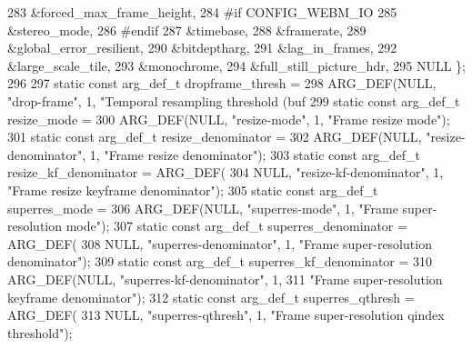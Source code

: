 \begin{DoxyCodeInclude}
{{283                                           &forced\_max\_frame\_height,
284 \textcolor{preprocessor}{#if CONFIG\_WEBM\_IO}
285                                           &stereo\_mode,
286 \textcolor{preprocessor}{#endif}
287                                           &timebase,
288                                           &framerate,
289                                           &global\_error\_resilient,
290                                           &bitdeptharg,
291                                           &lag\_in\_frames,
292                                           &large\_scale\_tile,
293                                           &monochrome,
294                                           &full\_still\_picture\_hdr,
295                                           NULL \};
296 
297 \textcolor{keyword}{static} \textcolor{keyword}{const} arg\_def\_t dropframe\_thresh =
298     ARG\_DEF(NULL, \textcolor{stringliteral}{"drop-frame"}, 1, \textcolor{stringliteral}{"Temporal resampling threshold (buf %
299 \textcolor{keyword}{static} \textcolor{keyword}{const} arg\_def\_t resize\_mode =
300     ARG\_DEF(NULL, \textcolor{stringliteral}{"resize-mode"}, 1, \textcolor{stringliteral}{"Frame resize mode"});
301 \textcolor{keyword}{static} \textcolor{keyword}{const} arg\_def\_t resize\_denominator =
302     ARG\_DEF(NULL, \textcolor{stringliteral}{"resize-denominator"}, 1, \textcolor{stringliteral}{"Frame resize denominator"});
303 \textcolor{keyword}{static} \textcolor{keyword}{const} arg\_def\_t resize\_kf\_denominator = ARG\_DEF(
304     NULL, \textcolor{stringliteral}{"resize-kf-denominator"}, 1, \textcolor{stringliteral}{"Frame resize keyframe denominator"});
305 \textcolor{keyword}{static} \textcolor{keyword}{const} arg\_def\_t superres\_mode =
306     ARG\_DEF(NULL, \textcolor{stringliteral}{"superres-mode"}, 1, \textcolor{stringliteral}{"Frame super-resolution mode"});
307 \textcolor{keyword}{static} \textcolor{keyword}{const} arg\_def\_t superres\_denominator = ARG\_DEF(
308     NULL, \textcolor{stringliteral}{"superres-denominator"}, 1, \textcolor{stringliteral}{"Frame super-resolution denominator"});
309 \textcolor{keyword}{static} \textcolor{keyword}{const} arg\_def\_t superres\_kf\_denominator =
310     ARG\_DEF(NULL, \textcolor{stringliteral}{"superres-kf-denominator"}, 1,
311             \textcolor{stringliteral}{"Frame super-resolution keyframe denominator"});
312 \textcolor{keyword}{static} \textcolor{keyword}{const} arg\_def\_t superres\_qthresh = ARG\_DEF(
313     NULL, \textcolor{stringliteral}{"superres-qthresh"}, 1, \textcolor{stringliteral}{"Frame super-resolution qindex threshold"});
}}}
\end{DoxyCodeInclude}
